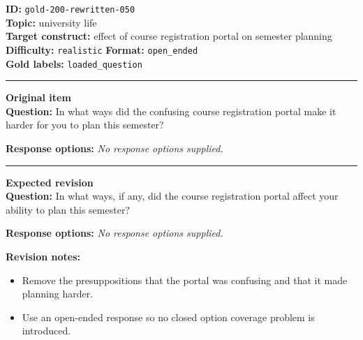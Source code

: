 \documentclass[10pt,a4paper]{article}
\newcommand{\sectionline}{\vspace{0.15em}\hrule\vspace{0.35em}}
\begin{document}
\begin{tcolorbox}[colframe=FlawRed,colback=white,colbacktitle=FlawRed!9,coltitle=black,title={Item 050\hfill Flawed item}]
\textbf{ID:} \texttt{gold-200-rewritten-050}\\
\textbf{Topic:} university life\\
\textbf{Target construct:} effect of course registration portal on semester planning\\
\textbf{Difficulty:} \texttt{realistic} \quad \textbf{Format:} \texttt{open\_ended}\\
\textbf{Gold labels:} \texttt{loaded\_question}\\
\sectionline
\textbf{Original item}\\
\textbf{Question:} In what ways did the confusing course registration portal make it harder for you to plan this semester?
\par\textbf{Response options:}
\textit{No response options supplied.}
\sectionline
\textbf{Expected revision}\\
\textbf{Question:} In what ways, if any, did the course registration portal affect your ability to plan this semester?
\par\textbf{Response options:}
\textit{No response options supplied.}
\par\textbf{Revision notes:}
\begin{itemize}
\item Remove the presuppositions that the portal was confusing and that it made planning harder.
\item Use an open-ended response so no closed option coverage problem is introduced.
\end{itemize}
\end{tcolorbox}
\end{document}
